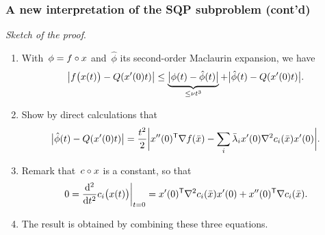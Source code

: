 \documentclass{polyu-presentation}
\newcommand{\con}[1][]{c\ifthenelse{\equal{#1}{}}{}{_{#1}}}
\newcommand{\iter}[1][]{x\ifthenelse{\equal{#1}{}}{}{^{#1}}}
\newcommand{\lm}[1][]{\lambda\ifthenelse{\equal{#1}{}}{}{^{#1}}}
\newcommand{\obj}{f}
\begin{document}
\begin{frame}
    \frametitle{A new interpretation of the SQP subproblem (cont'd)}

    \emph{Sketch of the proof}.
    \begin{enumerate}
        \item With~$\phi = \obj \circ \iter$ and~$\hat{\phi}$ its second-order Maclaurin expansion, we have
        \begin{equation*}
            \abs[\big]{\obj \big(\iter(t) \big) - Q(\iter'(0) t)} \le \underbrace{\abs[\big]{\phi(t) - \hat{\phi}(t)}}_{\le \nu t^3} + \abs[\big]{\hat{\phi}(t) - Q(\iter'(0) t)}.
        \end{equation*}
        \item Show by direct calculations that
        \begin{equation*}
            \abs[\big]{\hat{\phi}(t) - Q(\iter'(0) t)} = \frac{t^2}{2} \abs[\bigg]{\iter''(0)^{\T} \nabla \obj(\bar{\iter}) - \sum_i \bar{\lm}_i \iter'(0) \nabla^2 \con[i](\bar{\iter}) \iter'(0)}.
        \end{equation*}
        \item Remark that~$\con \circ x$ is a constant, so that
        \begin{equation*}
            0 = \frac{\du^2}{\du t^2} \con[i] \big( \iter(t) \big) \bigg\vert_{t = 0} = \iter'(0)^{\T} \nabla^2 \con[i](\bar{\iter}) \iter'(0) + \iter''(0)^{\T} \nabla \con[i](\bar{\iter}).
        \end{equation*}
        \item The result is obtained by combining these three equations.
    \end{enumerate}
\end{frame}
\end{document}
